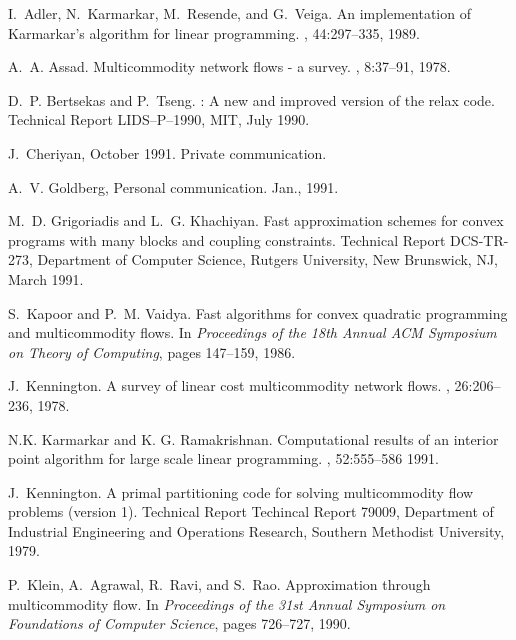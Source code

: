\begin{thebibliography}{10}


I.~Adler, N.~Karmarkar, M.~Resende, and G.~Veiga.
\newblock An implementation of {K}armarkar's algorithm for linear programming.
, 44:297--335, 1989.

A.~A. Assad.
\newblock Multicommodity network flows - a survey.
, 8:37--91, 1978.

D.~P. Bertsekas and P.~Tseng.
: A new and improved version of the {\sc relax} code.
\newblock Technical Report LIDS--P--1990, MIT, July 1990.

J.~Cheriyan, October 1991.
\newblock Private communication.

A.~V. Goldberg, Personal communication. Jan., 1991.

M.~D. Grigoriadis and L.~G. Khachiyan.
\newblock Fast approximation schemes for convex programs with many blocks and
  coupling constraints.
\newblock Technical Report DCS-TR-273, Department of Computer Science, Rutgers
  University, New Brunswick, NJ, March 1991.

S.~Kapoor and P.~M. Vaidya.
\newblock Fast algorithms for convex quadratic programming and multicommodity
  flows.
\newblock In {\em Proceedings of the 18th Annual {ACM} Symposium on Theory of
  Computing}, pages 147--159, 1986.

J.~Kennington.
\newblock A survey of linear cost multicommodity network flows.
, 26:206--236, 1978.

N.K. Karmarkar and K. G. Ramakrishnan.
\newblock Computational results  of an interior point algorithm for
large scale linear programming.
,  52:555--586 1991.

J.~Kennington.
\newblock A primal partitioning code for solving multicommodity flow problems
  (version 1).
\newblock Technical Report Techincal Report 79009, Department of Industrial
  Engineering and Operations Research, Southern Methodist University, 1979.

P.~Klein, A.~Agrawal, R.~Ravi, and S.~Rao.
\newblock Approximation through multicommodity flow.
\newblock In {\em Proceedings of the 31st Annual Symposium on Foundations of
  Computer Science}, pages 726--727, 1990.


\end{thebibliography}

